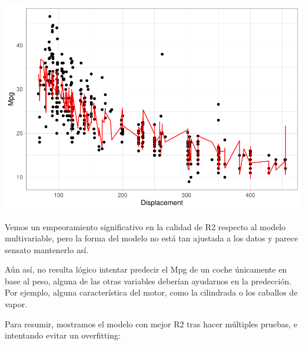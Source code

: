 \documentclass[
]{article}
\newenvironment{Shaded}{\begin{snugshade}}{\end{snugshade}}
\newcommand{\DataTypeTok}[1]{\textcolor[rgb]{0.13,0.29,0.53}{#1}}
\newcommand{\KeywordTok}[1]{\textcolor[rgb]{0.13,0.29,0.53}{\textbf{#1}}}
\newcommand{\NormalTok}[1]{#1}
\newcommand{\OperatorTok}[1]{\textcolor[rgb]{0.81,0.36,0.00}{\textbf{#1}}}
\newcommand{\StringTok}[1]{\textcolor[rgb]{0.31,0.60,0.02}{#1}}
\begin{document}
\begin{center}\includegraphics{Regresion_files/figure-latex/unnamed-chunk-24-3} \end{center}

Vemos un empeoramiento significativo en la calidad de R2 respecto al
modelo multivariable, pero la forma del modelo no está tan ajustada a
los datos y parece sensato mantenerlo así.

Aún así, no resulta lógico intentar predecir el Mpg de un coche
únicamente en base al peso, alguna de las otras variables deberían
ayudarnos en la predección. Por ejemplo, alguna característica del
motor, como la cilindrada o los caballos de vapor.

Para resumir, mostramos el modelo con mejor R2 tras hacer múltiples
pruebas, e intentando evitar un overfitting:

\begin{Shaded}
\end{Shaded}
\end{document}
